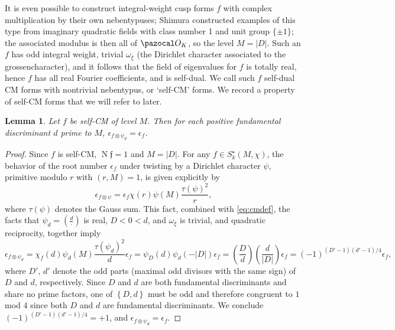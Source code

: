 \documentclass[11pt,reqno]{amsart} \usepackage{fullpage}
\newtheorem{lemma}{Lemma}
\newcommand{\ep}{\epsilon}
\newcommand\be{\begin{equation}}
\newcommand\ee{\end{equation}}
\renewcommand{\a}{{\mathfrak f}}
\DeclareMathOperator{\Nm}{N}
\numberwithin{equation}{section}
\begin{document}
It is even possible to construct integral-weight cusp forms $f$ with complex multiplication
by their own nebentypuses; Shimura constructed examples of this type from imaginary
quadratic fields with class number 1 and unit group $\{\pm1\}$; the associated modulus is
then all of $\pazocal O_K$, so the level $M=|D|$. Such an $f$ has odd integral weight,
trivial $\omega_\xi$ (the Dirichlet character associated to the grossencharacter), and it
follows that the field of eigenvalues for $f$ is totally real, hence $f$ has all real
Fourier coefficients, and is self-dual.
We call such $f$ self-dual CM forms with nontrivial nebentypus, or `self-CM' forms.
We record a property of self-CM forms that we will refer to later.
\begin{lemma}\label{lem:goinnowhere} Let $f$ be self-CM of level $M$.
  Then for each positive fundamental discriminant $d$ prime to $M$,
  $\ep_{f\otimes\psi_d}=\ep_f$.\end{lemma}
\begin{proof}
  Since $f$ is self-CM, $\Nm\a=1$ and $M=|D|$.
  For any $f\in S^\star_k(M,\chi)$, the behavior of the root number $\ep_f$ under twisting
  by a Dirichlet character $\psi$, primitive modulo $r$ with $(r,M)=1$, is given explicitly
  by \be\ep_{f\otimes\psi}=\ep_f\chi(r)\psi(M)\frac{\tau(\psi)^2}{r},\ee where $\tau(\psi)$
  denotes the Gauss sum. This fact, combined with \eqref{eq:cmdef}, the facts that
  $\psi_d=\left(\frac d\cdot\right)$ is real, $D<0<d$, and $\omega_\xi$ is trivial,
  and quadratic reciprocity, together imply
  \be\label{eq:quadrecip}
  \ep_{f\otimes\psi_d}=\chi_f(d)\psi_d(M)\frac{\tau(\psi_d)^2}{d}\ep_f
  =\psi_D(d)\psi_d(-|D|)\ep_f=\left(\frac Dd\right)\left(\frac d{|D|} \right)\ep_f
  =(-1)^{(D'-1)(d'-1)/4}\ep_f,\ee
  where $D'$, $d'$ denote the odd parts (maximal odd divisors with the same sign) of $D$
  and $d$, respectively. Since $D$ and $d$ are both fundamental discriminants and share no
  prime factors, one of $\left\{D,d\right\}$ must be odd and therefore congruent to
  $1$ mod $4$ since both $D$ and $d$ are fundamental discriminants.
  We conclude $(-1)^{(D'-1)(d'-1)/4}=+1$, and $\ep_{f\otimes\psi_d}=\ep_f$.
\end{proof}
\end{document}
